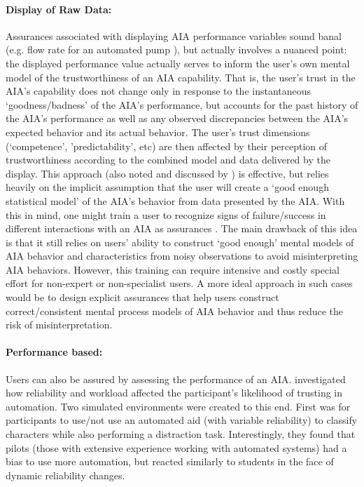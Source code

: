 \paragraph{Display of Raw Data:}
Assurances associated with displaying AIA performance variables sound banal (e.g. flow rate for an automated pump \cite{Muir1996-gt}), but actually involves a nuanced point: the displayed performance value actually serves to inform the user's own mental model of the trustworthiness of an AIA capability. That is, the user's trust in the AIA's capability does not change only in response to the instantaneous `goodness/badness' of the AIA's performance, but accounts for the past history of the AIA's performance as well as any observed discrepancies between the AIA's expected behavior and its actual behavior. The user's trust dimensions (`competence', 'predictability', etc) are then affected by their perception of trustworthiness according to the combined model and data delivered by the display. This approach (also noted and discussed by \cite{Wickens1999-la,Sheridan1984-kx,Hutchins2015-if}) is effective, but relies heavily on the implicit assumption that the user will create a `good enough statistical model' of the AIA's behavior from data presented by the AIA. With this in mind, one might train a user to recognize signs of failure/success in different interactions with an AIA as assurances \cite{Freedy2007-sg,Desai2012-rc,Salem2015-md}. The main drawback of this idea is that it still relies on users' ability to construct `good enough' mental models of AIA behavior and characteristics from noisy observations to avoid misinterpreting AIA behaviors. However, this training can require intensive and costly special effort for non-expert or non-specialist users. A more ideal approach in such cases would be to design explicit assurances that help users construct correct/consistent mental process models of AIA behavior and thus reduce the risk of misinterpretation.

\paragraph{Performance based:}
Users can also be assured by assessing the performance of an AIA. \citet{Riley1996-qm} investigated how reliability and workload affected the participant's likelihood of trusting in automation. Two simulated environments were created to this end. First was for participants to use/not use an automated aid (with variable reliability) to classify characters while also performing a distraction task. Interestingly, they found that pilots (those with extensive experience working with automated systems) had a bias to use more automation, but reacted similarly to students in the face of dynamic reliability changes.

